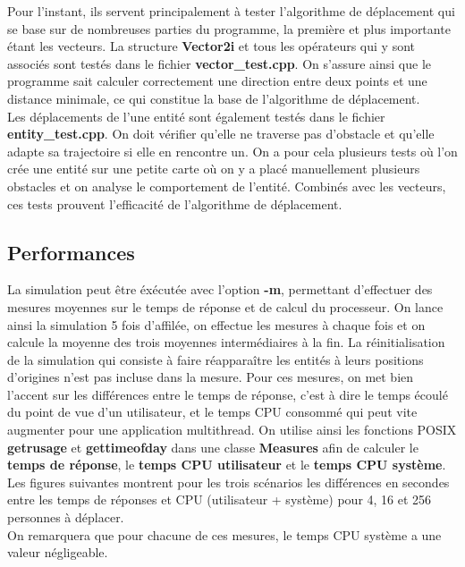 \documentclass[11pt]{article} %
\begin{document}
Pour l'instant, ils servent principalement à tester l'algorithme de déplacement qui se base sur de nombreuses parties du programme, la première et plus importante étant les vecteurs. La structure \textbf{Vector2i} et tous les opérateurs qui y sont associés sont testés dans le fichier \textbf{vector\_test.cpp}. On s'assure ainsi que le programme sait calculer correctement une direction entre deux points et une distance minimale, ce qui constitue la base de l'algorithme de déplacement. \\
Les déplacements de l'une entité sont également testés dans le fichier \textbf{entity\_test.cpp}. On doit vérifier qu'elle ne traverse pas d'obstacle et qu'elle adapte sa trajectoire si elle en rencontre un. On a pour cela plusieurs tests où l'on crée une entité sur une petite carte où on y a placé manuellement plusieurs obstacles et on analyse le comportement de l'entité. Combinés avec les vecteurs, ces tests prouvent l'efficacité de l'algorithme de déplacement.

\subsection{Performances}
La simulation peut être éxécutée avec l'option \textbf{-m}, permettant d'effectuer des mesures moyennes sur le temps de réponse et de calcul du processeur. On lance ainsi la simulation 5 fois d'affilée, on effectue les mesures à chaque fois et on calcule la moyenne des trois moyennes intermédiaires à la fin. La réinitialisation de la simulation qui consiste à faire réapparaître les entités à leurs positions d'origines n'est pas incluse dans la mesure. Pour ces mesures, on met bien l'accent sur les différences entre le temps de réponse, c'est à dire le temps écoulé du point de vue d'un utilisateur, et le temps CPU consommé qui peut vite augmenter pour une application multithread. On utilise ainsi les fonctions POSIX \textbf{getrusage} et \textbf{gettimeofday} dans une classe \textbf{Measures} afin de calculer le \textbf{temps de réponse}, le \textbf{temps CPU utilisateur} et le \textbf{temps CPU système}. Les figures suivantes montrent pour les trois scénarios les différences en secondes entre les temps de réponses et CPU (utilisateur + système) pour 4, 16 et 256 personnes à déplacer. \\
On remarquera que pour chacune de ces mesures, le temps CPU système a une valeur négligeable.
\end{document}
